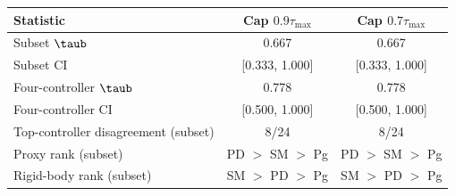 \begin{tabular}{lcc}
\toprule
Statistic & Cap $0.9\tau_{\max}$ & Cap $0.7\tau_{\max}$ \\
\midrule
Subset $\taub$                         & 0.667 & 0.667 \\
Subset CI                              & [0.333, 1.000] & [0.333, 1.000] \\
Four-controller $\taub$                & 0.778 & 0.778 \\
Four-controller CI                     & [0.500, 1.000] & [0.500, 1.000] \\
Top-controller disagreement (subset)   & 8/24 & 8/24 \\
Proxy rank (subset)                    & PD $>$ SM $>$ Pg & PD $>$ SM $>$ Pg \\
Rigid-body rank (subset)               & SM $>$ PD $>$ Pg & SM $>$ PD $>$ Pg \\
\bottomrule
\end{tabular}
